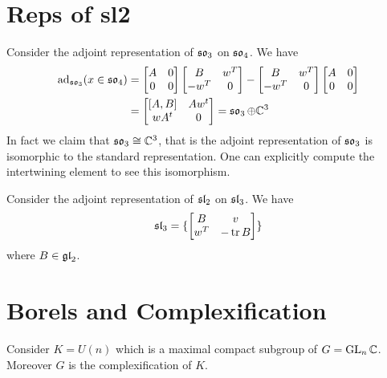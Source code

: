 \documentclass[12pt]{article}
\begin{document}
\section{Reps of sl2}
\begin{example}
Consider the adjoint representation of $\so_3$ on $\so_4$. We have \begin{align*}
    \ad_{\so_3}(x\in\so_4) &= \begin{bmatrix}
        A & 0\\
        0 & 0 
    \end{bmatrix} \begin{bmatrix}
        B & w^T\\
        -w^T & 0 
    \end{bmatrix} -  \begin{bmatrix}
        B & w^T\\
        -w^T & 0 
    \end{bmatrix}\begin{bmatrix}
        A & 0\\
        0 & 0 
    \end{bmatrix} \\
    &= \begin{bmatrix}
        [A,B] & Aw^t \\
        wA^t & 0
    \end{bmatrix} = \so_3 \oplus \C^3
\end{align*}
In fact we claim that $\so_3\cong \C^3$, that is the adjoint representation of $\so_3$ is isomorphic to the standard representation. One can explicitly compute the intertwining element to see this isomorphism.
\end{example}

\begin{example}
Consider the adjoint representation of $\sl_2$ on $\sl_3$. We have \begin{align*}
    \sl_3 = \set{\begin{bmatrix}
        B & v\\
        w^T & -\tr B
    \end{bmatrix}} 
\end{align*} where $B\in\gl_2$.
\end{example}

\section{Borels and Complexification}
Consider $K = U(n)$ which is a maximal compact subgroup of $G = \GL_n\C$. Moreover $G$
is the complexification of $K$.
\end{document}
